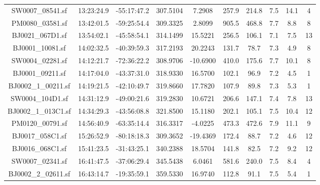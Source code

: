 \documentclass[fleqn,usenatbib]{mnras}
\begin{document}
\begin{table}
\begin{scriptsize}
\begin{center}
\begin{tabular}{@{\extracolsep{\fill}}c|c|c|c|c|c|c|c|c|c}
  SW0007\_08541.sf    &   13:23:24.9  &   -55:17:47.2   &    307.5104    &    7.2908    &    257.9    &    214.8    &    7.5    &    14.1    &    4    \\ 
  PM0080\_03581.sf    &   13:42:01.5  &   -59:25:54.4   &    309.3325    &    2.8099    &    905.5    &    468.8    &    7.7    &    8.8    &    8    \\ 
  BJ0021\_067D1.sf    &   13:54:02.1  &   -45:58:54.1   &    314.1499    &    15.5221    &    256.5    &    106.1    &    7.1    &    7.5    &    13    \\ 
  BJ0001\_10081.sf    &   14:02:32.5  &   -40:39:59.3   &    317.2193    &    20.2243    &    131.7    &    78.7    &    7.3    &    4.9    &    8    \\ 
  SW0004\_02281.sf    &   14:12:21.7  &   -72:36:22.2   &    308.9706    &    -10.6900    &    410.0    &    175.6    &    7.7    &    10.1    &    8    \\ 
  BJ0001\_09211.sf    &   14:17:04.0  &   -43:37:31.0   &    318.9330    &    16.5700    &    102.1    &    96.9    &    7.2    &    4.5    &    1    \\ 
  BJ0002\_1\_00211.sf    &   14:19:21.5  &   -42:10:49.7   &    319.8660    &    17.7820    &    107.9    &    89.8    &    7.3    &    5.3    &    1    \\ 
  SW0004\_104D1.sf    &   14:31:12.9  &   -49:00:21.6   &    319.2830    &    10.6721    &    206.6    &    147.1    &    7.4    &    7.8    &    13    \\ 
  BJ0002\_1\_013C1.sf    &   14:34:29.3  &   -43:56:08.8   &    321.8500    &    15.1180    &    202.1    &    105.1    &    7.5    &    10.4    &    12    \\ 
  PM0120\_00791.sf    &   14:56:40.9  &   -63:35:14.4   &    316.3317    &    -4.0225    &    473.3    &    472.6    &    7.9    &    11.1    &    9    \\ 
  BJ0017\_058C1.sf    &   15:26:52.9  &   -80:18:18.3   &    309.3652    &    -19.4369    &    172.4    &    88.7    &    7.2    &    4.6    &    12    \\ 
  BJ0016\_068C1.sf    &   15:41:23.5  &   -31:43:25.1   &    340.2388    &    18.5704    &    141.8    &    82.5    &    7.2    &    9.2    &    12    \\ 
  SW0007\_02341.sf    &   16:41:47.5  &   -37:06:29.4   &    345.5438    &    6.0461    &    581.6    &    240.0    &    7.5    &    8.4    &    4    \\ 
  BJ0002\_2\_02611.sf    &   16:43:14.7  &   -19:35:59.1   &    359.5330    &    16.9740    &    112.8    &    91.1    &    7.5    &    5.4    &    1    \\ 

\end{tabular}
\end{center}
\end{scriptsize}
\end{table}
\end{document}
